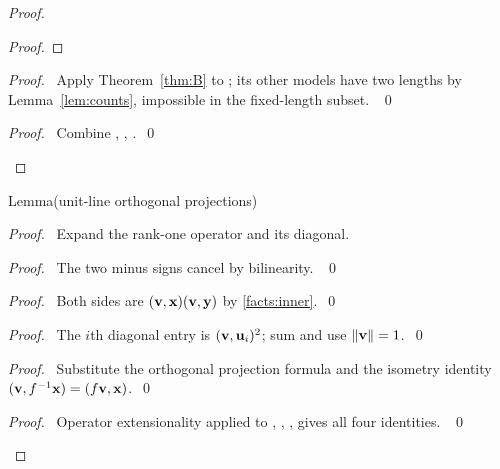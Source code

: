 \begin{proof}
\begin{proof}
\end{proof}
\begin{proof}\pf\ Apply Theorem~\ref{thm:B} to ;
its other models have two lengths by Lemma~\ref{lem:counts}, impossible
in the fixed-length subset. ~\qed\end{proof}
\qedstep
\begin{proof}\pf\ Combine ,
, .~\qed\end{proof}
\end{proof}

\begin{namedresult}{Lemma}{(unit-line orthogonal projections)}\label{lem:rem-projectors}
\end{namedresult}
\begin{proof}
\pfsketch\ Expand the rank-one operator and its diagonal.
\begin{proof}\pf\ The two minus signs cancel by bilinearity. ~\qed\end{proof}
\begin{proof}\pf\ Both sides are $({\mathbf v},{\mathbf x})({\mathbf v},{\mathbf y})$ by
\ref{facts:inner}.~\qed\end{proof}
\begin{proof}\pf\ The $i$th diagonal entry is $({\mathbf v},{\mathbf u}_i)^2$;
sum and use $\|{\mathbf v}\|=1$.~\qed\end{proof}
\begin{proof}\pf\ Substitute the orthogonal projection formula and the isometry
identity $({\mathbf v},f^{-1}{\mathbf x})=(f{\mathbf v},{\mathbf x})$.~\qed\end{proof}
\qedstep
\begin{proof}\pf\ Operator extensionality applied to
, , ,
 gives all four identities. ~\qed\end{proof}
\end{proof}

